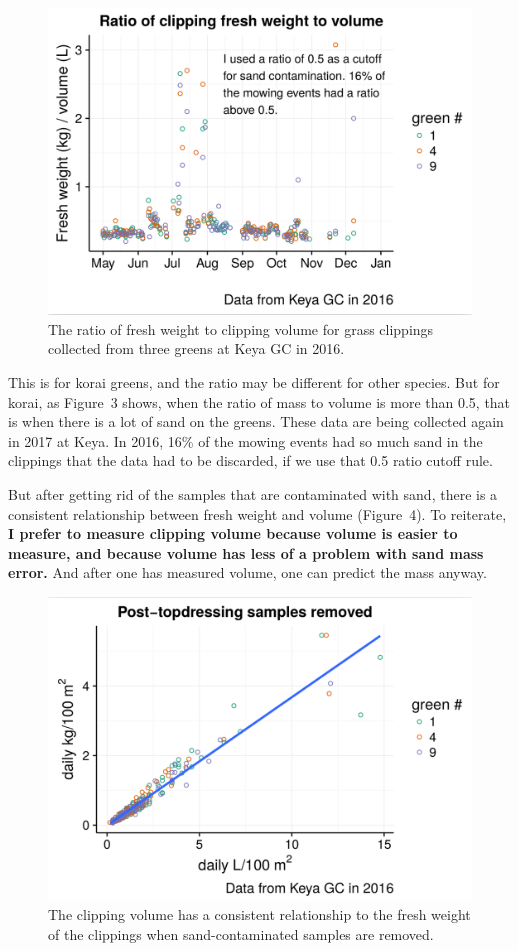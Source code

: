 \documentclass[12pt,b5,]{tufte-book}
\begin{document}
\begin{figure}
\centering
\includegraphics{figs/ratioChart.png}
\caption{The ratio of fresh weight to clipping volume for grass clippings
collected from three greens at Keya GC in 2016.}
\end{figure}

This is for korai greens, and the ratio may be different for other
species. But for korai, as Figure~3 shows, when the ratio of
mass to volume is more than 0.5, that is when there is a lot of sand on
the greens. These data are being collected again in 2017 at Keya. In
2016, 16\% of the mowing events had so much sand in the clippings that
the data had to be discarded, if we use that 0.5 ratio cutoff rule.

But after getting rid of the samples that are contaminated with sand,
there is a consistent relationship between fresh weight and volume
(Figure~4). To reiterate, \textbf{I prefer to measure clipping
volume because volume is easier to measure, and because volume has less
of a problem with sand mass error.} And after one has measured volume,
one can predict the mass anyway.

\begin{figure}
\centering
\includegraphics{figs/volTokg.png}
\caption{The clipping volume has a consistent relationship to the fresh weight
of the clippings when sand-contaminated samples are removed.}
\end{figure}
\end{document}
